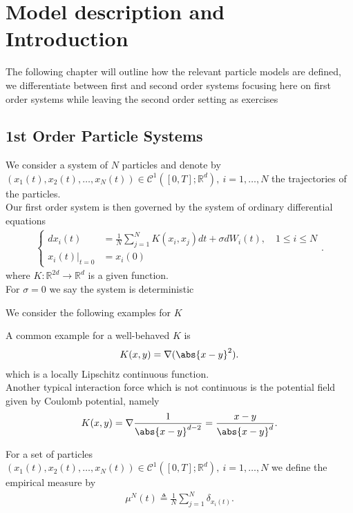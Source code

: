 \chapter{Model description and Introduction}
The following chapter will outline how the relevant particle models 
are defined, we differentiate between first and second order systems
focusing here on first order systems while leaving the second order setting
as exercises 
\section{1st Order Particle Systems}
\begin{definition}
  We consider a system of $N$ particles and denote by $(x_{1}(t),x_{2}(t),\ldots,x_N(t)) \in  \mathcal{C}^{1}([0,T];\mathbb{R}^{d} ),\ i=1,\ldots ,N $ 
  the trajectories of the particles.\\[1ex]
  Our first order system is then governed by the system of ordinary differential equations 
  \begin{align*}
    \begin{cases}
      d x_i(t) &= \frac{1}{N}\sum_{j=1}^{N} K(x_{i},x_{j}) dt + \sigma dW_i(t), \quad 1\le i \le N \\
        x_i(t)\rvert_{t=0} &= x_i(0)
    \end{cases}
  .\end{align*}
  where $K : \mathbb{R}^{2d} \to \mathbb{R}^{d}  $ is a given function.\\[1ex]
  For $\sigma  = 0$ we say the system is deterministic
\end{definition}
We consider the following examples for $K$ 
\begin{example}
A common example for a well-behaved $K$ is 
\begin{align*}
  K(x,y) =  \nabla (\abs{x-y}^2)
.\end{align*}
which is a locally Lipschitz continuous function. \\[1ex]
Another typical interaction force which is not continuous 
is the potential field given by Coulomb potential, namely 
\begin{align*}
  K(x,y) = \nabla \frac{1}{\abs{x-y}^{d-2}} = \frac{x-y}{\abs{x-y}^{d} }
.\end{align*}
\end{example}
\begin{definition}\label{empirical_measure}
 For a set of particles\\
 $(x_{1}(t),x_{2}(t),\ldots,x_N(t)) \in  \mathcal{C}^{1}([0,T];\mathbb{R}^{d} ),\ i=1,\ldots ,N $ we define the empirical measure by 
 \begin{align*}
   \mu^{N}(t) \triangleq \frac{1}{N} \sum_{j=1}^{N} \delta_{x_i(t)} 
 .\end{align*}
\end{definition}

